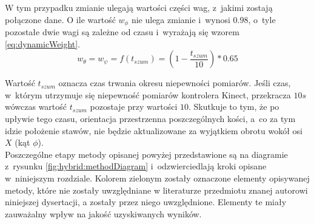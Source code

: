 																
W tym przypadku zmianie ulegają wartości części wag, z~jakimi zostają połączone dane. O ile wartość $w_\phi$ nie ulega zmianie i~wynosi $0.98$, o~tyle pozostałe dwie wagi są zależne od czasu i~wyrażają się wzorem \ref{eq:dynamicWeight}.
\begin{equation}
	w_{\theta} = w_{\psi} = f(t_{szum}) = (1-\frac{t_{szum}}{10}) * 0.65
	\label{eq:dynamicWeight}
\end{equation}
																
Wartość $t_{szum}$ oznacza czas trwania okresu niepewności pomiarów. Jeśli czas, w~którym utrzymuje się niepewność pomiarów kontrolera Kinect, przekracza $10s$ wówczas wartość $t_{szum}$ pozostaje przy wartości $10$. Skutkuje to tym, że po upływie tego czasu, orientacja przestrzenna poszczególnych kości, a~co za tym idzie położenie stawów, nie będzie aktualizowane za wyjątkiem obrotu wokół osi $X$ (kąt $\phi$). \\
																

Poszczególne etapy metody opisanej powyżej przedstawione są na diagramie z~rysunku \ref{fig:hybrid:methodDiagram} i~odzwierciedlają kroki opisane w~niniejszym rozdziale. Kolorem zielonym zostały oznaczone elementy opisywanej metody, które nie zostały uwzględniane w literaturze przedmiotu znanej autorowi niniejszej dysertacji, a zostały przez niego uwzględnione. Elementy te miały zauważalny wpływ na jakość uzyskiwanych wyników.